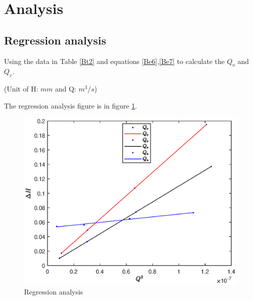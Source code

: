 \section{Analysis}
\label{sec:analysis}
\subsection{Regression analysis}

Using the data in Table \ref{Bt2} and equations \eqref{Be6},\eqref{Be7} to calculate the $Q_o$ and $Q_v$.


\begin{table}[h]
    \centering

(Unit of H: $mm$ and Q: $m^3/s$)
\caption{Flow rates measured by different methods}
\label{Bt4}
\end{table}

The regression analysis figure is in figure \ref{Bf4}.

\begin{figure}[htb] %
    \centering
    \includegraphics[scale=1.1]{Results/B.eps}
    \caption{Regression analysis}
    \label{Bf4}
\end{figure}


